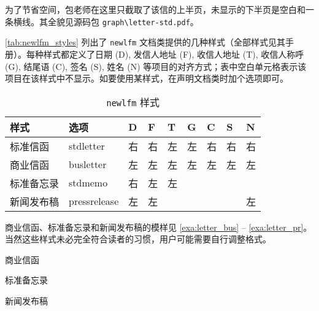 \clearpage

为了节省空间，包老师在这里只截取了该信的上半页，未显示的下半页是空白和一条横线。其全貌见源码包 \verb|graph\letter-std.pdf|。

\autoref{tab:newlfm_styles} 列出了 \texttt{newlfm} 文档类提供的几种样式（全部样式见其手册）。每种样式都定义了日期 (D), 发信人地址 (F), 收信人地址 (T), 收信人称呼 (G), 结尾语 (C), 签名 (S), 姓名 (N) 等项目的对齐方式；表中空白单元格表示该项目在该样式中不显示。如要使用某样式，在声明文档类时加个选项即可。

\begin{table}[htbp]
\centering
\caption{\texttt{newlfm} 样式}
\label{tab:newlfm_styles}
\begin{tabular}{lllllllll}
  \toprule
  样式 & 选项 & D & F & T & G & C & S & N\\
  \midrule
  标准信函 & stdletter & 右 & 右 & 左 & 左 & 右 & 右 & 右\\
  商业信函 & busletter & 左 & 左 & 左 & 左 & 左 & 左 & 左\\
  标准备忘录 & stdmemo & 右 & 左 & 左 & & & & \\
  新闻发布稿 & pressrelease & 左 & 左 & & & & & 左\\
  \bottomrule
\end{tabular}
\end{table}

商业信函、标准备忘录和新闻发布稿的模样见 \autoref{exa:letter_bus} -- \autoref{exa:letter_pr}。当然这些样式未必完全符合读者的习惯，用户可能需要自行调整格式。

\begin{example}[htbp]
\begin{Demo}
\centering
{}
\end{Demo}
\caption{商业信函}
\label{exa:letter_bus}
\end{example}

\begin{example}[htbp]
\begin{Demo}
\centering
{}
\end{Demo}
\caption{标准备忘录}
\label{exa:letter_memo}
\end{example}

\begin{example}[!h]
\begin{Demo}
\centering
{}
\end{Demo}
\caption{新闻发布稿}
\label{exa:letter_pr}
\end{example}

